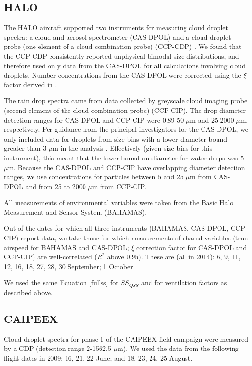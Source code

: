 \documentclass{article}
\begin{document}
\subsection{HALO}

The HALO aircraft supported two instruments for measuring cloud droplet spectra: a cloud and aerosol spectrometer (CAS-DPOL) and a cloud droplet probe (one element of a cloud combination probe) (CCP-CDP) \cite{Braga2017}. We found that the CCP-CDP consistently reported unphysical bimodal size distributions, and therefore used only data from the CAS-DPOL for all calculations involving cloud droplets. Number concentrations from the CAS-DPOL were corrected using the $\xi$ factor derived in \cite{Weigel2016}.

The rain drop spectra came from data collected by greyscale cloud imaging probe (second element of the cloud combination probe) (CCP-CIP). The drop diameter detection ranges for CAS-DPOL and CCP-CIP were 0.89-50 $\mu$m and 25-2000 $\mu$m, respectively. Per guidance from the principal investigators for the CAS-DPOL, we only included data for droplets from size bins with a lower diameter bound greater than 3 $\mu$m in the analysis \cite{Jurkat2020}. Effectively (given size bins for this instrument), this meant that the lower bound on diameter for water drops was 5 $\mu$m. Because the CAS-DPOL and CCP-CIP have overlapping diameter detection ranges, we use concentrations for particles between 5 and 25 $\mu$m from CAS-DPOL and from 25 to 2000 $\mu$m from CCP-CIP. 

All measurements of environmental variables were taken from the Basic Halo Measurement and Sensor System (BAHAMAS).

Out of the dates for which all three instruments (BAHAMAS, CAS-DPOL, CCP-CIP) report data, we take those for which measurements of shared variables (true airspeed for BAHAMAS and CAS-DPOL; $\xi$ correction factor for CAS-DPOL and CCP-CIP) are well-correlated ($R^2$ above 0.95). These are (all in 2014): 6, 9, 11, 12, 16, 18, 27, 28, 30 September; 1 October.

We used the same Equation \ref{fullss} for $SS_{QSS}$ and for ventilation factors as described above.

\subsection{CAIPEEX}

Cloud droplet spectra for phase 1 of the CAIPEEX field campaign were measured by a CDP (detection range 2-1562.5 $\mu$m). We used the data from the following flight dates in 2009: 16, 21, 22 June; and 18, 23, 24, 25 August.
\end{document}
